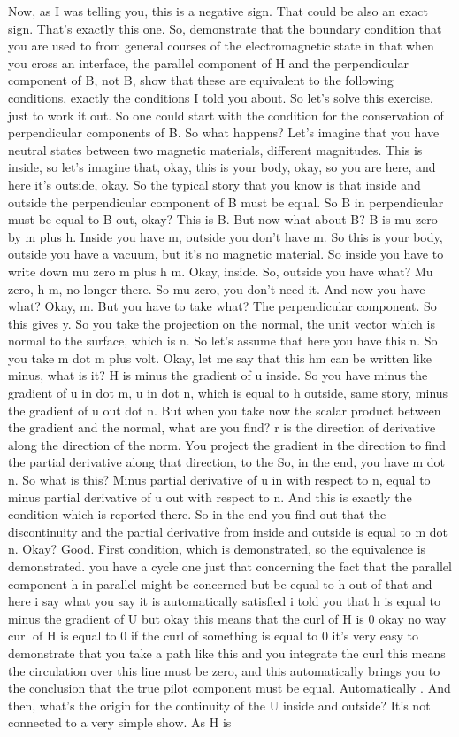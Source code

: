 Now, as I was telling you, this is a negative sign. That could be also an exact sign. That's exactly this one. So, demonstrate that the boundary condition that you are used to from general courses of the electromagnetic state in that when you cross an interface, the parallel component of H and the perpendicular component of B, not B, show that these are equivalent to the following conditions, exactly the conditions I told you about. So let's solve this exercise, just to work it out. So one could start with the condition for the conservation of perpendicular components of B. So what happens? Let's imagine that you have neutral states between two magnetic materials, different magnitudes. This is inside, so let's imagine that, okay, this is your body, okay, so you are here, and here it's outside, okay. So the typical story that you know is that inside and outside the perpendicular component of B must be equal. So B in perpendicular must be equal to B out, okay? This is B. But now what about B? B is mu zero by m plus h. Inside you have m, outside you don't have m. So this is your body, outside you have a vacuum, but it's no magnetic material. So inside you have to write down mu zero m plus h m. Okay, inside. So, outside you have what? Mu zero, h m, no longer there. So mu zero, you don't need it. And now you have what? Okay, m. But you have to take what? The perpendicular component. So this gives y. So you take the projection on the normal, the unit vector which is normal to the surface, which is n. So let's assume that here you have this n. So you take m dot m plus volt. Okay, let me say that this hm can be written like minus, what is it? H is minus the gradient of u inside. So you have minus the gradient of u in dot m, u in dot n, which is equal to h outside, same story, minus the gradient of u out dot n. But when you take now the scalar product between the gradient and the normal, what are you find? r is the direction of derivative along the direction of the norm. You project the gradient in the direction to find the partial derivative along that direction, to the So, in the end, you have m dot n. So what is this? Minus partial derivative of u in with respect to n, equal to minus partial derivative of u out with respect to n. And this is exactly the condition which is reported there. So in the end you find out that the discontinuity and the partial derivative from inside and outside is equal to m dot n. Okay? Good. First condition, which is demonstrated, so the equivalence is demonstrated. you have a cycle one just that concerning the fact that the parallel component h in parallel might be concerned but be equal to h out of that and here i say what you say it is automatically satisfied i told you that h is equal to minus the gradient of U but okay this means that the curl of H is 0 okay no way curl of H is equal to 0 if the curl of something is equal to 0 it's very easy to demonstrate that you take a path like this and you integrate the curl this means the circulation over this line must be zero, and this automatically brings you to the conclusion that the true pilot component must be equal. Automatically . And then, what's the origin for the continuity of the U inside and outside? It's not connected to a very simple show. As H is 